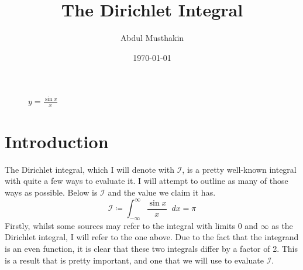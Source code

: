 \documentclass[a4paper]{article}
\title{The Dirichlet Integral}
\author{Abdul Musthakin}
\date{\today}
\newcommand*\diff{\mathop{}\!d} %
\theoremstyle{definition}
\begin{document}
\maketitle

\begin{figure}[!h]
    \centering
    \captionsetup{justification=centering}
    \caption{$y = \frac{\sin x}{x}$}
    \label{fig:fig1}
\end{figure}

\pagebreak

\tableofcontents

\section{Introduction}

The Dirichlet integral, which I will denote with $\mathcal{I}$, is a pretty well-known integral with quite a few ways to evaluate it.
I will attempt to outline as many of those ways as possible.
Below is $\mathcal{I}$ and the value we claim it has.
\begin{equation}
    \mathcal{I} \coloneq \int_{-\infty}^{\infty} \frac{\sin x}{x} \diff x = \pi
\end{equation}
Firstly, whilst some sources may refer to the integral with limits 0 and $\infty$ as the Dirichlet integral, I will refer to the one above.
Due to the fact that the integrand is an even function, it is clear that these two integrals differ by a factor of 2.
This is a result that is pretty important, and one that we will use to evaluate $\mathcal{I}$.
\end{document}
